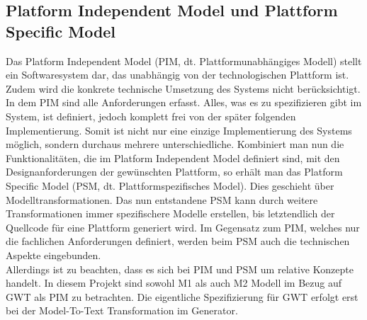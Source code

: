 \subsection{Platform Independent Model und Plattform Specific Model} \label{PIMPSM}
Das Platform Independent Model (PIM, dt. Plattformunabhängiges Modell) stellt ein
Softwaresystem dar, das unabhängig von der technologischen Plattform ist. Zudem wird die konkrete technische Umsetzung des Systems nicht berücksichtigt. In dem PIM
sind alle Anforderungen erfasst. Alles, was es zu spezifizieren gibt im System, ist definiert,
jedoch komplett frei von der später folgenden Implementierung. Somit ist nicht nur eine
einzige Implementierung des Systems möglich, sondern durchaus mehrere
unterschiedliche.
Kombiniert man nun die Funktionalitäten, die im Platform Independent Model definiert sind, mit den Designanforderungen der gewünschten Plattform, so erhält man das Platform Specific Model (PSM, dt. Plattformspezifisches Model). Dies geschieht über Modelltransformationen. Das nun entstandene PSM kann durch weitere Transformationen immer spezifischere Modelle erstellen, bis letztendlich der Quellcode für eine Plattform generiert wird. Im Gegensatz zum PIM, welches nur die
fachlichen Anforderungen definiert, werden beim PSM auch die technischen Aspekte
eingebunden.\cite[S.377 ff.]{bib:MDA2}\cite{bib:MDA3}\\ 
 
Allerdings ist zu beachten, dass es sich bei PIM und PSM um relative Konzepte handelt. 
In diesem Projekt sind sowohl M1 als auch M2 Modell im Bezug auf GWT als PIM zu betrachten. Die eigentliche Spezifizierung für GWT erfolgt erst bei der Model-To-Text Transformation im Generator.